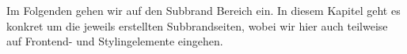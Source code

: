Im Folgenden gehen wir auf den Subbrand Bereich ein. In diesem Kapitel geht es konkret um die jeweils erstellten Subbrandseiten, wobei wir hier auch teilweise auf Frontend- und Stylingelemente eingehen.